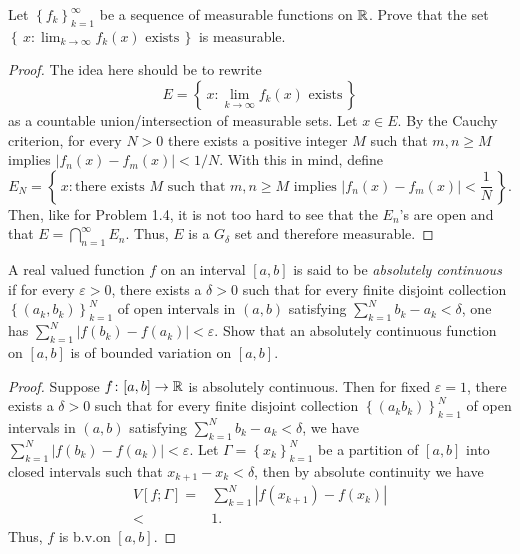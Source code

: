 \begin{problem}
Let $\left\{f_k\right\}_{k=1}^\infty$ be a sequence of measurable functions
on $\mathbb{R}$. Prove that the set
$\left\{\,x:\text{$\lim_{k\to\infty} f_k(x)$ exists}\,\right\}$
is measurable.
\end{problem}
\begin{proof}
The idea here should be to rewrite
\begin{equation}
  \label{eq:measurable-lim-set}
E=\left\{\,x:\text{$\lim_{k\to\infty} f_k(x)$ exists}\,\right\}
\end{equation}
as a countable union/intersection of measurable sets. Let $x\in E$. By the
Cauchy criterion, for every $N>0$ there exists a positive integer
$M$ such that $m,n\geq M$ implies
$\left|f_n(x)-f_m(x)\right|<1/N$. With this in mind, define
\begin{equation}
  \label{eq:countable-lim-set}
E_N=
\left\{\,
x:\text{there exists $M$ such that $m,n\geq M$ implies $\left|f_n(x)-f_m(x)\right|<\frac{1}{N}$}
\,\right\}.
\end{equation}
Then, like for Problem 1.4, it is not too hard to see that the $E_n$'s are
open and that $E=\bigcap_{n=1}^\infty E_n$. Thus, $E$ is a $G_\delta$ set
and therefore measurable.
\end{proof}

\begin{problem}
A real valued function $f$ on an interval $[a,b]$ is said to be
\emph{absolutely continuous} if for every $\varepsilon>0$, there exists a
$\delta>0$ such that for every finite disjoint collection
$\left\{(a_k,b_k)\right\}_{k=1}^N$ of open intervals in $(a,b)$ satisfying
$\sum_{k=1}^Nb_k-a_k<\delta$, one has
$\sum_{k=1}^N\left|f(b_k)-f(a_k)\right|<\varepsilon$. Show that an
absolutely continuous function on $[a,b]$ is of bounded variation on
$[a,b]$.
\end{problem}
\begin{proof}
Suppose $f\colon[a,b]\to\mathbb{R}$ is absolutely continuous. Then for fixed
$\varepsilon=1$, there exists a $\delta>0$ such that for every finite
disjoint collection $\left\{ (a_kb_k) \right\}_{k=1}^N$ of open intervals
in $(a,b)$ satisfying $\sum_{k=1}^Nb_k-a_k<\delta$, we have
$\sum_{k=1}^N\left|f(b_k)-f(a_k)\right|<\varepsilon$. Let
$\Gamma=\left\{x_k\right\}_{k=1}^N$ be a partition of $[a,b]$ into closed
intervals such that $x_{k+1}-x_k<\delta$, then by absolute continuity we have
\begin{equation}
\label{eq:absolute-continuity-variation}
\begin{aligned}
V[f;\Gamma]
={}&\sum_{k=1}^N\left|f(x_{k+1})-f(x_k)\right|\\
<{}&1.
\end{aligned}
\end{equation}
Thus, $f$ is b.v.\@ on $[a,b]$.
\end{proof}


